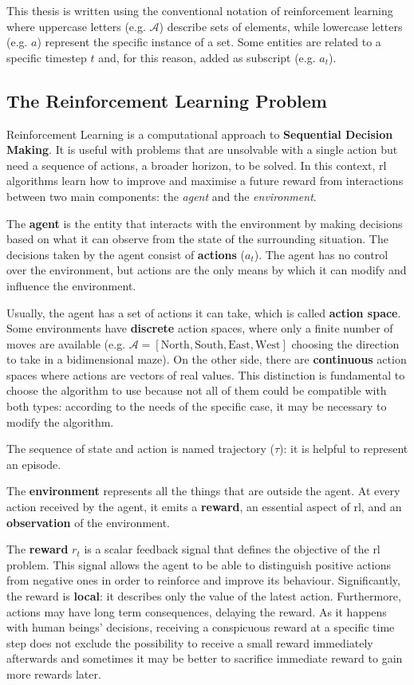 This thesis is written using the conventional notation of reinforcement learning where uppercase letters (e.g. $\mathcal{A}$) describe sets of elements, while lowercase letters (e.g. $a$) represent the specific instance of a set. Some entities are related to a specific timestep $t$ and, for this reason, added as subscript (e.g. $a_t$).

\subsection{The Reinforcement Learning Problem}

Reinforcement Learning is a computational approach to \textbf{Sequential Decision Making}. It is useful with problems that are unsolvable with a single action but need a sequence of actions, a broader horizon, to be solved. In this context, \acrshort{rl} algorithms learn how to improve and maximise a future reward from interactions between two main components: the \textit{agent} and the \textit{environment}. 

The \textbf{agent} is the entity that interacts with the environment by making decisions based on what it can observe from the state of the surrounding situation. The decisions taken by the agent consist of \textbf{actions} ($a_t$).  The agent has no control over the environment, but actions are the only means by which it can modify and influence the environment.

Usually, the agent has a set of actions it can take, which is called \textbf{action space}.
Some environments have \textbf{discrete} action spaces, where only a finite number of moves are available (e.g. $\mathcal{A} = [\text{North}, \text{South}, \text{East}, \text{West}]$ choosing the direction to take in a bidimensional maze). On the other side, there are \textbf{continuous} action spaces where actions are vectors of real values.
This distinction is fundamental to choose the algorithm to use because not all of them could be compatible with both types: according to the needs of the specific case, it may be necessary to modify the algorithm.

The sequence of state and action is named trajectory ($\tau$): it is helpful to represent an episode.

The \textbf{environment} represents all the things that are outside the agent. At every action received by the agent, it emits a \textbf{reward}, an essential aspect of \acrshort{rl}, and an \textbf{observation} of the environment.

The \textbf{reward} $r_t$ is a scalar feedback signal that defines the objective of the \acrshort{rl} problem. This signal allows the agent to be able to distinguish positive actions from negative ones in order to reinforce and improve its behaviour. Significantly, the reward is \textbf{local}: it describes only the value of the latest action. Furthermore, actions may have long term consequences, delaying the reward. As it happens with human beings' decisions, receiving a conspicuous reward at a specific time step does not exclude the possibility to receive a small reward immediately afterwards and sometimes it may be better to sacrifice immediate reward to gain more rewards later.


